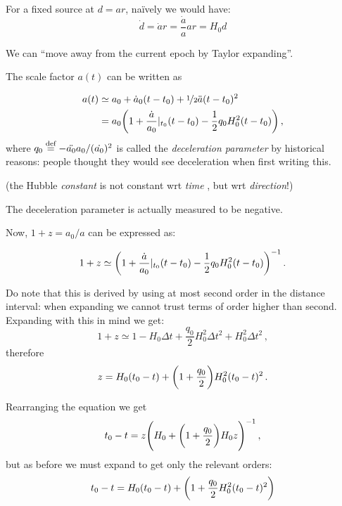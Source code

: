 \documentclass[main.tex]{subfiles}
\begin{document}
For a fixed source at \(d = ar\), naïvely we would have:
%
\begin{equation}
  \dot{d} = \dot{a} r = \frac{\dot{a} }{a} ar = H_0  d
\end{equation}

We can ``move away from the current epoch by Taylor expanding''.

The scale factor \(a(t)\) can be written as

\begin{subequations}
\begin{align}
    a(t) &\simeq a_0 + \dot{a}_0 (t-t_0 ) + \frac[i]{1}{2} \ddot{a}(t-t_0)^2\\
    &= a_0 \qty(1 + \frac{\dot{a} }{a_0}|_{t_0 } (t-t_0 ) - \frac{1}{2} q_0 H_0 ^2 (t-t_0 ))\,,
\end{align}
\end{subequations}
%
where \(q_0 \stackrel{\text{def}}{=} - \ddot{a_0 } a_0 / (\dot{a_0 } )^2\) is called the \emph{deceleration parameter} by historical reasons: people thought they would see deceleration when first writing this.

(the Hubble \emph{constant} is not constant wrt \emph{time} , but wrt \emph{direction}!)

The deceleration parameter is actually measured to be negative.

Now, \(1 + z = a_0 / a\) can be expressed as:

\begin{equation}
    1+ z \simeq \qty(1 + \frac{\dot{a} }{a_0}|_{t_0 } (t-t_0 ) - \frac{1}{2} q_0 H_0 ^2 (t-t_0 ))^{-1}\,.
\end{equation}

Do note that this is derived by using at most second order in the distance interval: when expanding we cannot trust terms of order higher than second. Expanding with this in mind we get:
%
\begin{equation}
  1+ z \simeq
  1 - H_0 \Delta t + \frac{q_0 }{2} H_0^2 \Delta t^2 + H_0^2 \Delta t^2\,,
\end{equation}
%
therefore
%
\begin{equation}
  z = H_0 (t_0 - t) + \qty(1 + \frac{q_0}{2}) H_0^2 (t_0 - t)^2\,.
\end{equation}

Rearranging the equation we get
%
\begin{equation}
  t_0 - t = z \qty(H_0 + \qty(1+\frac{q_0}{2})H_0 z)^{-1}\,,
\end{equation}
%
but as before we must expand to get only the relevant orders:
\begin{equation}
  t_0 - t = H_0 (t_0 - t) + \qty(1+ \frac{q_0}{2}H_0^2 (t_0 - t)^2)
\end{equation}
\end{document}
